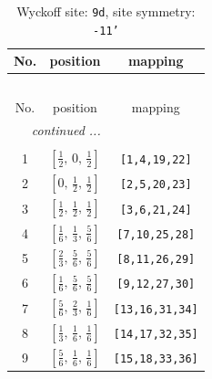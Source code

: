 \documentclass[fleqn,8pt]{jsarticle}
\begin{document}
\begin{longtable}{ccc}
\caption{Wyckoff site: {\tt 9d}, site symmetry: {\tt -11'}}
 \\
 \hline \hline
No. & position & mapping \\ \hline \endfirsthead

\multicolumn{2}{l}{\tablename\ \thetable{}} \\
 \hline \hline
No. & position & mapping \\ \hline \endhead

 \hline \hline
\multicolumn{2}{r}{\footnotesize\it continued ...} \\ \endfoot

 \hline \hline
\multicolumn{2}{r}{} \\ \endlastfoot

1 & $\left[ \frac{1}{2},\, 0,\, \frac{1}{2} \right]$ & {\tt [1,4,19,22]} \\ \hline
2 & $\left[ 0,\, \frac{1}{2},\, \frac{1}{2} \right]$ & {\tt [2,5,20,23]} \\ \hline
3 & $\left[ \frac{1}{2},\, \frac{1}{2},\, \frac{1}{2} \right]$ & {\tt [3,6,21,24]} \\ \hline
4 & $\left[ \frac{1}{6},\, \frac{1}{3},\, \frac{5}{6} \right]$ & {\tt [7,10,25,28]} \\ \hline
5 & $\left[ \frac{2}{3},\, \frac{5}{6},\, \frac{5}{6} \right]$ & {\tt [8,11,26,29]} \\ \hline
6 & $\left[ \frac{1}{6},\, \frac{5}{6},\, \frac{5}{6} \right]$ & {\tt [9,12,27,30]} \\ \hline
7 & $\left[ \frac{5}{6},\, \frac{2}{3},\, \frac{1}{6} \right]$ & {\tt [13,16,31,34]} \\ \hline
8 & $\left[ \frac{1}{3},\, \frac{1}{6},\, \frac{1}{6} \right]$ & {\tt [14,17,32,35]} \\ \hline
9 & $\left[ \frac{5}{6},\, \frac{1}{6},\, \frac{1}{6} \right]$ & {\tt [15,18,33,36]} \\
\end{longtable}
\renewcommand{\arraystretch}{1.2}
\end{document}

